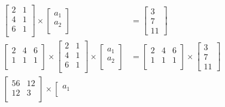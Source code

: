 \documentclass[12pt,twoside]{amsart}
\begin{document}
\begin{enumerate}
    \begin{align*}
    \left[\begin{array}{cc}
        2 & 1 \\
        4 & 1 \\
        6 & 1 \\
    \end{array}\right] \times \left[\begin{array}{c}
        a_1 \\
        a_2 \\
    \end{array}\right] & = \left[\begin{array}{c}
        3 \\
        7 \\
        11
    \end{array}\right] \\
    \left[\begin{array}{ccc}
        2 & 4 & 6 \\
        1 & 1 & 1 \\
    \end{array}\right] \times \left[\begin{array}{cc}
        2 & 1 \\
        4 & 1 \\
        6 & 1 \\
    \end{array}\right] \times \left[\begin{array}{c}
        a_1 \\
        a_2 \\
    \end{array}\right] & = \left[\begin{array}{ccc}
        2 & 4 & 6 \\
        1 & 1 & 1 \\
    \end{array}\right] \times \left[\begin{array}{c}
        3 \\
        7 \\
        11
    \end{array}\right] \\
    \left[\begin{array}{cc}
        56 & 12 \\
        12 & 3 \\
    \end{array}\right] \times \left[\begin{array}{cc}
        a_1 \\

\end{array}
\end{align*}
\end{enumerate}
\end{document}
